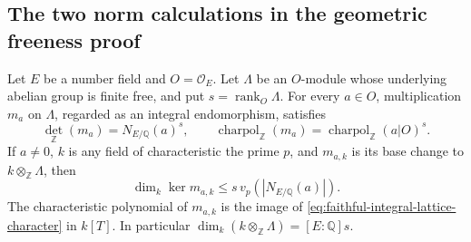 \subsection{The two norm calculations in the geometric freeness proof}
\label{subsec:faithful-free-norm-calculations}

\begin{srlemma}
\label{lem:faithful-integral-lattice-norm}
Let \(E\) be a number field and \(O=\mathcal O_E\).
Let \(\Lambda\) be an \(O\)-module whose underlying abelian group
is finite free, and put \(s=\operatorname{rank}_O\Lambda\).
For every \(a\in O\), multiplication \(m_a\) on \(\Lambda\),
regarded as an integral endomorphism, satisfies
\[
 \det_{\mathbb Z}(m_a)=N_{E/\mathbb Q}(a)^s,\qquad
 \operatorname{charpol}_{\mathbb Z}(m_a)
                   =\operatorname{charpol}_{\mathbb Z}(a|O)^s .
 \tag{NN1}\label{eq:faithful-integral-lattice-character}
\]
If \(a\ne0\), \(k\) is any field of characteristic the prime \(p\),
and \(m_{a,k}\) is its base change to \(k\otimes_{\mathbb Z}\Lambda\),
then
\[
 \dim_k\ker m_{a,k}\le s\,v_p(|N_{E/\mathbb Q}(a)|).
 \tag{NN2}\label{eq:faithful-integral-lattice-kernel}
\]
The characteristic polynomial of \(m_{a,k}\) is the image of
\eqref{eq:faithful-integral-lattice-character} in \(k[T]\).
In particular \(\dim_k(k\otimes_{\mathbb Z}\Lambda)=[E:\mathbb Q]s\).
\end{srlemma}
